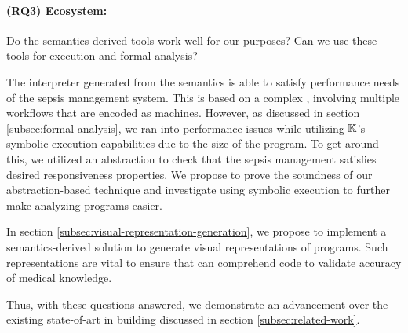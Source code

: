 \paragraph{(RQ3) Ecosystem:} Do the semantics-derived tools work well for
our purposes? Can we use these tools for execution and formal analysis?

The interpreter generated from the semantics is able to satisfy performance
needs of the sepsis management system. This \CDSS{} is based on a complex
\BPG{}, involving multiple workflows that are encoded as \MediK{} machines.
However, as discussed in section \ref{subsec:formal-analysis},
we ran into performance issues while utilizing $\mathbb{K}$'s symbolic
execution capabilities due to the size of the program. To get around this,
we utilized an abstraction to check that the sepsis management \CDSS{} satisfies
desired responsiveness properties. We propose to prove the soundness
of our abstraction-based technique and investigate using symbolic execution
to further make analyzing programs easier.

In section \ref{subsec:visual-representation-generation}, we propose to
implement a semantics-derived solution to generate visual representations
of \MediK{} programs. Such representations are vital to ensure that
\HCPs{} can comprehend \MediK{} code to validate accuracy of medical knowledge.

Thus, with these questions answered, we demonstrate an advancement over
the existing state-of-art in building \CDSSs{} discussed in section \ref{subsec:related-work}.


